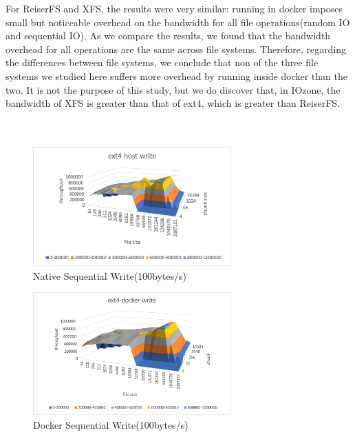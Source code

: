 \documentclass[letterpaper,twocolumn,10pt]{article}
\begin{document}
For ReiserFS and XFS, the results were very similar: running in docker imposes small but noticeable overhead on the bandwidth for all file 
operations(random IO and sequential IO). As we compare the results, we found that the bandwidth overhead for all operations are the same across 
file systems. Therefore, regarding the differences between file systems, we conclude that non of the three file systems we studied here suffers 
more overhead by running inside docker than the two. It is not the purpose of this study, but we do discover 
that, in IOzone, the bandwidth of XFS is greater 
than that of ext4, which is greater than ReiserFS. \\

\noindent{}
\\\\



\begin{figure}[!ht]
\centering
\includegraphics[width=3in]{../results/ext4-host-write.png}
\caption{Native Sequential Write(100bytes/s)}
\label{fig:ext4-host-write}
\end{figure}

\begin{figure}[!ht]
\centering
\includegraphics[width=3in]{../results/ext4-docker-write.png}
\caption{Docker Sequential Write(100bytes/s)}
\label{fig:ext4-docker-write}
\end{figure}
\end{document}
